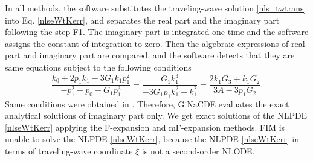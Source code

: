 \documentclass[prd,aps,floats,showkeys,nofootinbib,notitlepage]{revtex4-2}
\begin{document}
	
	In all methods, the software substitutes the traveling-wave solution \eqref{nls_twtrans} into Eq. \eqref{nlseWtKerr}, and separates the real part and the imaginary part following the step F1. The imaginary part is integrated one time and the software assigns the constant of integration to zero. Then the algebraic expressions of real part and imaginary part are compared, and the software detects that they are same equations subject to the following conditions
	\begin{equation}\label{nlseWtKerrCond}
		\frac{{{k_0} + 2{p_1}{k_1} - 3{G_1}{k_1}p_1^2}}{{ - p_1^2 - {p_0} + {G_1}p_1^3}} = \frac{{{G_1}k_1^3}}{{ - 3{G_1}{p_1}k_1^2 + k_1^2}} = \frac{{2{k_1}{G_3} + {k_1}{G_2}}}{{3A - 3{p_1}{G_2}}}.
	\end{equation}
	Same conditions were obtained in \cite{complexTwt1}. Therefore, GiNaCDE evaluates the exact analytical solutions of imaginary part only. 
	We get exact solutions of the NLPDE \eqref{nlseWtKerr} applying the F-expansion and mF-expansion methods. FIM is unable to solve the NLPDE \eqref{nlseWtKerr}, because the NLPDE \eqref{nlseWtKerr} in terms of traveling-wave coordinate $\xi$ is not a second-order NLODE.  
	
	
\end{document}
